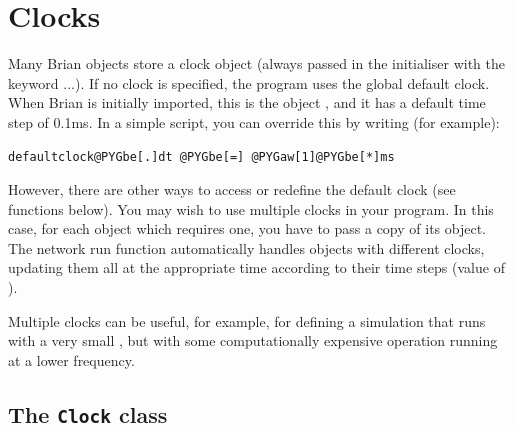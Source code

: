 \documentclass[letterpaper,10pt,english]{manual}
\begin{document}
\hypertarget{index-75}{}\section{Clocks}
Many Brian objects store a clock object (always passed in the
initialiser with the keyword ...). If no clock is specified,
the program uses the global default clock. When Brian is initially
imported, this is the object \hyperlink{brian.defaultclock}{}, and it has a default
time step of 0.1ms. In a simple script, you can override this by
writing (for example):

\begin{Verbatim}[commandchars=@\[\]]
defaultclock@PYGbe[.]dt @PYGbe[=] @PYGaw[1]@PYGbe[*]ms
\end{Verbatim}

However, there are other ways to access or redefine the default
clock (see functions below).
You may wish to use multiple clocks in your program. In this case,
for each object which requires one, you have to pass a copy of its
\hyperlink{brian.Clock}{} object. The network run function automatically handles objects
with different clocks, updating them all at the appropriate time
according to their time steps (value of \hyperlink{brian.Clock.dt}{}).

Multiple clocks can be useful, for example, for defining a simulation
that runs with a very small , but with some computationally
expensive operation running at a lower frequency.


\subsection{The \texttt{Clock} class}
\end{document}
